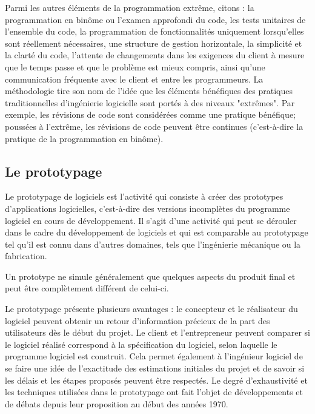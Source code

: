 \begin{enumerate}
    Parmi les autres éléments de la programmation extrême, citons : la programmation en binôme ou
    l'examen approfondi du code, les tests unitaires de l'ensemble du code, la programmation de
    fonctionnalités uniquement lorsqu'elles sont réellement nécessaires, une structure de gestion
    horizontale, la simplicité et la clarté du code, l'attente de changements dans les exigences du
    client à mesure que le temps passe et que le problème est mieux compris, ainsi qu'une communication
    fréquente avec le client et entre les programmeurs. La méthodologie tire son nom de l'idée que les
    éléments bénéfiques des pratiques traditionnelles d'ingénierie logicielle sont portés à des niveaux
    "extrêmes". Par exemple, les révisions de code sont considérées comme une pratique bénéfique;
    poussées à l'extrême, les révisions de code peuvent être continues (c'est-à-dire la pratique de la programmation en binôme).
\end{enumerate}

\subsection{Le prototypage}\label{subsec:prototypage}
Le prototypage de logiciels est l'activité qui consiste à créer des prototypes
d'applications logicielles, c'est-à-dire des versions incomplètes du programme
logiciel en cours de développement. Il s'agit d'une activité qui peut se dérouler
dans le cadre du développement de logiciels et qui est comparable au prototypage
tel qu'il est connu dans d'autres domaines, tels que l'ingénierie mécanique ou la fabrication.

Un prototype ne simule généralement que quelques aspects du produit final et peut être
complètement différent de celui-ci.

Le prototypage présente plusieurs avantages : le concepteur et le réalisateur du
logiciel peuvent obtenir un retour d'information précieux de la part des utilisateurs
dès le début du projet. Le client et l'entrepreneur peuvent comparer si le logiciel
réalisé correspond à la spécification du logiciel, selon laquelle le programme
logiciel est construit. Cela permet également à l'ingénieur logiciel de se faire
une idée de l'exactitude des estimations initiales du projet et de savoir si les délais
et les étapes proposés peuvent être respectés. Le degré d'exhaustivité et les techniques
utilisées dans le prototypage ont fait l'objet de développements et de débats depuis leur
proposition au début des années 1970.

